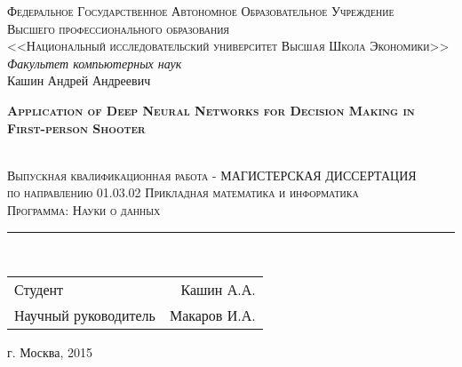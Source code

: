
\thispagestyle{empty}

\begin{center}

  \textsc{Федеральное Государственное Автономное Образовательное Учреждение}\\[0.2cm]

  \textsc{Высшего профессионального образования \\ <<Национальный исследовательский университет Высшая Школа Экономики>>}\\[0.7cm]

  \textit{Факультет компьютерных наук}\\[0.5cm]
  
  Кашин Андрей Андреевич \\ [0.5cm]

  \begin{Large}
    \textsc{\textbf{Application of Deep Neural Networks for Decision Making in First-person Shooter}}
  \end{Large}\\[1cm]

  \textsc{Выпускная квалификационная работа - МАГИСТЕРСКАЯ ДИССЕРТАЦИЯ \\
  по направлению 01.03.02 Прикладная математика и информатика \\
  Программа: Науки о данных}\\[0.7cm] 
  
  \rule{\textwidth}{0.5pt}\\[1.5cm]

\end{center}

\begin{center}
  \begin{tabular}{lr}
    Студент &
    Кашин А.А.
    \\[0.7cm]
    Научный руководитель &
    Макаров И.А.
  \end{tabular}

  \vspace{1.5cm}

  \vfill
  г. Москва, 2015

\end{center}